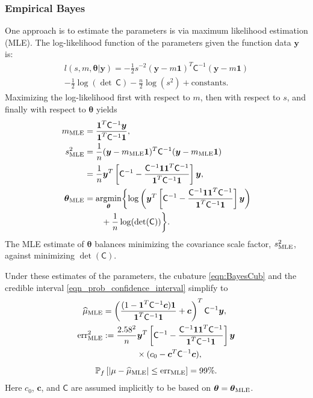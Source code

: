 \documentclass[twocolumn]{svjour3}          %
\newcommand{\bm}[1]{\boldsymbol{#1}}
\newcommand{\vtheta}{{\bm{\theta}}}
\newcommand{\vc}{\bm{c}}
\newcommand{\vy}{\bm{y}}
\newcommand{\vone}{\bm{1}}
\newcommand{\mC}{\mathsf{C}}
\newcommand{\mCInv}{{\mathsf{C}^{-1}}}
\newcommand{\hmu}{\widehat{\mu}}
\newcommand{\MLE}{\textup{MLE}}
\newcommand{\err}{\textup{err}}
\providecommand{\argmin}{\operatorname*{argmin}}
\begin{document}
\subsubsection{Empirical Bayes}  \label{sec:MLE}
One approach is to estimate the parameters is via maximum likelihood estimation (MLE).  The log-likelihood function of the parameters given the function data $\vy$ is:
\begin{multline*}
l(s,m,\vtheta | \vy)
= -\frac{1}{2} s^{-2} (\vy-m\vone)^T\mCInv(\vy-m\vone) 
\\
 - \frac{1}{2} \log(\det\, \mC) - \frac{n}{2} \log(s^2) + \text{constants.}
\end{multline*}
Maximizing the log-likelihood first with respect to $m$, then with respect to $s$, and finally with respect to $\vtheta$ yields
\begin{align}
\label{eqn_m_MLE}
m_\MLE &= \frac{\vone^T \mCInv \vy }{ \vone^T \mCInv \vone}, \\
\nonumber
s^2_{\MLE}  
&= \frac{1}{n} (\vy-m_{\MLE}\vone)^T\mCInv(\vy-m_{\MLE}\vone) 
\\
\label{eqn_s2_MLE}
&= 
\frac{1}{n}
\vy^T 
\left[ 
\mCInv - 
\frac{ \mCInv \vone \vone^T \mCInv }{\vone^T\mCInv \vone}
\right] \vy, \\
\nonumber
\vtheta_\MLE
&= \argmin_{\vtheta} \biggl \{
\log\left(\vy^T 
\left[ \mCInv - 
\frac{ \mCInv \vone \vone^T \mCInv }{\vone^T\mCInv \vone}
\right] \vy 
\right)  \\
\label{eqn:thetaMLE}
 & \qquad +  \frac{1}{n} \log(\det(\mC))
\biggr \}.
\end{align}
The MLE estimate of $\vtheta$ balances minimizing the covariance scale factor, $s^2_{\MLE}$, against minimizing  $\det(\mC)$. 

Under these estimates of the parameters, the cubature \eqref{eqn:BayesCub} and the credible interval \eqref{eqn_prob_confidence_interval} simplify to 
\begin{align} \label{eqn:cubMLE}
\hmu_\MLE  &= 
\left(
\frac{ (1 - \vone^T  \mCInv\vc )  \vone }{ \vone^T \mCInv \vone}   +  \vc 
\right)^T  \mCInv \vy, \\
\nonumber 
\err_\MLE^2 & : = \frac{2.58^2}{n}
 \vy^T \left[ \mCInv - 
\frac{ \mCInv \vone \vone^T \mCInv }{\vone^T\mCInv \vone}
\right] \vy \\
\label{eqn:errMLE}
&\qquad \qquad \times 
(c_0 - \vc^T\mC^{-1}\vc ),
\end{align}
\begin{equation}
\label{eqn_prob_CI_MLE}
\mathbb{P}_f \left[
|\mu-\hmu_\MLE| \leq \err_\MLE \right]  = 99\%.
\end{equation}
Here $c_0$, $\vc$, and $\mC$ are assumed implicitly to be based on $\vtheta = \vtheta_\MLE$.   
\end{document}
